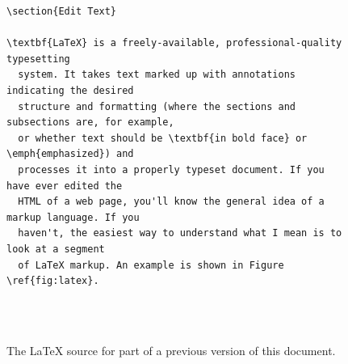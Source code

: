 \documentclass[11pt,article]{memoir}
\begin{document}
\begin{figure}
\begin{lstlisting}[style=sweave-top]
\end{lstlisting}
\begin{lstlisting}[language={[latex]tex},numbers=none,style=sweave-tex]
\section{Edit Text}

\textbf{LaTeX} is a freely-available, professional-quality typesetting
  system. It takes text marked up with annotations indicating the desired
  structure and formatting (where the sections and subsections are, for example, 
  or whether text should be \textbf{in bold face} or \emph{emphasized}) and 
  processes it into a properly typeset document. If you have ever edited the 
  HTML of a web page, you'll know the general idea of a markup language. If you 
  haven't, the easiest way to understand what I mean is to look at a segment 
  of LaTeX markup. An example is shown in Figure \ref{fig:latex}.

 
\end{lstlisting}
\begin{lstlisting}[style=sweave-bottom]
\end{lstlisting}
\caption{The LaTeX source for part of a previous version of this document.}
\label{fig:latex}
\end{figure}

\smallskip
\end{document}
